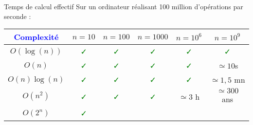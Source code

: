 \documentclass[10pt]{beamer}
\begin{document}
\begin{frame}[fragile]{\Ctitle}{\stitle}
	\begin{block}{Temps de calcul effectif}
		Sur un ordinateur réalisant 100 million d'opérations par seconde :
		\renewcommand{\arraystretch}{1.3}
		\begin{tabular}{|c|c|c|c|c|c|}
			\hline
			\textcolor{blue}{Complexité} & $n=10$                      & $n=100$                     & $n=1000$                    & $n=10^6$                    & $n=10^9$                    \\
			\hline
			$O(\log(n))$                 & \textcolor{green}{\faCheck} & \textcolor{green}{\faCheck} & \textcolor{green}{\faCheck} & \textcolor{green}{\faCheck} & \textcolor{green}{\faCheck} \\
			\hline
			$O(n)$                       & \textcolor{green}{\faCheck} & \textcolor{green}{\faCheck} & \textcolor{green}{\faCheck} & \textcolor{green}{\faCheck} & $\simeq 10$s                \\
			\hline
			$O(n)\log(n)$                & \textcolor{green}{\faCheck} & \textcolor{green}{\faCheck} & \textcolor{green}{\faCheck} & \textcolor{green}{\faCheck} & $\simeq 1,5$ mn             \\
			\hline
			$O(n^2)$                     & \textcolor{green}{\faCheck} & \textcolor{green}{\faCheck} & \textcolor{green}{\faCheck} & $\simeq 3$ h                & $\simeq 300$ ans            \\
			\hline
			$O(2^n)$                     & \textcolor{green}{\faCheck} & \textcolor{red}{\faTimes}   & \textcolor{red}{\faTimes}   & \textcolor{red}{\faTimes}   & \textcolor{red}{\faTimes}   \\
			\hline
		\end{tabular}
	\end{block}
\end{frame}
\end{document}
